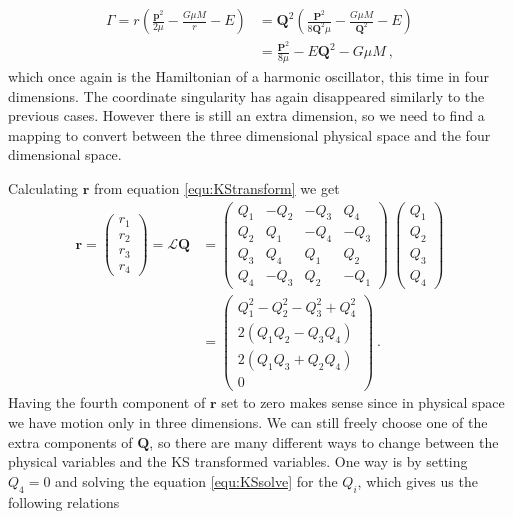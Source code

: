 \documentclass[english, oneside]{HYgradu}
\begin{document}
\begin{align}
\Gamma = r \left( \frac{\mathbf{p}^2}{2 \mu} - \frac{G \mu M}{r} - E \right) &= \mathbf{Q}^2 \left( \frac{\mathbf{P}^2}{8 \mathbf{Q}^2 \mu} - \frac{G \mu M}{\mathbf{Q}^2} - E \right) \nonumber \\ 
&= \frac{\mathbf{P}^2}{8 \mu} - E \mathbf{Q}^2 - G \mu M \ ,
\end{align}
which once again is the Hamiltonian of a harmonic oscillator, this time in four dimensions. The coordinate singularity has again disappeared similarly to the previous cases.
However there is still an extra dimension, so we need to find a mapping to convert between the three dimensional physical space and the four dimensional space.

Calculating $\mathbf{r}$ from equation \eqref{equ:KStransform} we get
\begin{align} \label{equ:KSsolve}
\mathbf{r} = 
\begin{pmatrix}
r_1 \\
r_2 \\
r_3 \\
r_4
\end{pmatrix}
= \mathcal{L} \mathbf{Q} &=
\begin{pmatrix}
Q_1 & -Q_2 & -Q_3 & Q_4 \\
Q_2 & Q_1 & -Q_4 & -Q_3 \\
Q_3 & Q_4 & Q_1 & Q_2 \\
Q_4 & -Q_3 & Q_2 & -Q_1
\end{pmatrix} \ 
\begin{pmatrix}
Q_1 \\
Q_2 \\
Q_3 \\
Q_4
\end{pmatrix}
\nonumber \\
&= 
\begin{pmatrix}
Q_1^2 - Q_2^2 - Q_3^2 + Q_4^2 \\
2(Q_1 Q_2 - Q_3 Q_4) \\
2(Q_1 Q_3 + Q_2 Q_4) \\
0
\end{pmatrix} \ .
\end{align}
Having the fourth component of $\mathbf{r}$ set to zero makes sense since in physical space we have motion only in three dimensions.
We can still freely choose one of the extra components of $\mathbf{Q}$, so there are many different ways to change between the physical variables and the KS transformed variables. One way is by setting $Q_4 = 0$ and solving the equation \eqref{equ:KSsolve} for the $Q_i$, which gives us the following relations
\end{document}
